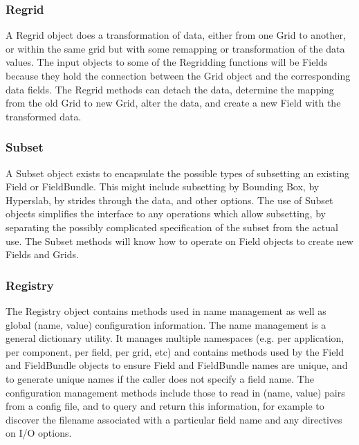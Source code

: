 \subsubsection{Regrid}

A Regrid object does a transformation of data, either from
one Grid to another, or within the same grid but with some remapping
or transformation of the data values.  The input objects to
some of the Regridding functions will be Fields because they
hold the connection between the Grid object and the corresponding
data fields.  The Regrid methods can detach the data, determine
the mapping from the old Grid to new Grid, alter the data, and
create a new Field with the transformed data.

\subsubsection{Subset}

A Subset object 
exists to encapsulate the possible types of subsetting an existing
Field or FieldBundle.  This might include subsetting by Bounding Box,
by Hyperslab, by strides through the data, and other options.
The use of Subset objects simplifies the interface to
any operations which allow subsetting, by separating the
possibly complicated specification of the subset from the
actual use.  The Subset methods will know how to operate on Field
objects to create new Fields and Grids.

\subsubsection{Registry}

The Registry object contains methods used in name management
as well as global (name, value) configuration information.
The name management is a general dictionary utility.  It
manages multiple namespaces (e.g. per application, per component,
per field, per grid, etc) and contains methods used by the
Field and FieldBundle objects to ensure Field and FieldBundle names
are unique, and to generate unique names if the caller does
not specify a field name.
The configuration management methods include those to 
read in (name, value) pairs from a config file, and to query
and return this information, for example to discover the
filename associated with a particular field name and
any directives on I/O options.


